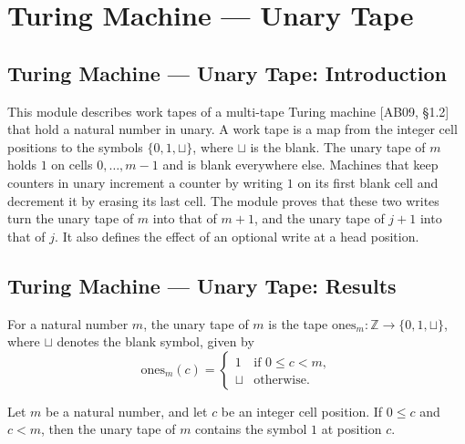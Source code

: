 \section{Turing Machine --- Unary Tape}
\subsection*{Turing Machine --- Unary Tape: Introduction}

This module describes work tapes of a multi-tape Turing machine [AB09, \S 1.2] that hold a
natural number in unary. A work tape is a map from the integer cell positions to the symbols
$\{0, 1, \sqcup\}$, where $\sqcup$ is the blank. The unary tape of $m$ holds $1$ on cells
$0, \dots, m-1$ and is blank everywhere else. Machines that keep counters in unary increment a
counter by writing $1$ on its first blank cell and decrement it by erasing its last cell. The
module proves that these two writes turn the unary tape of $m$ into that of $m+1$, and the unary
tape of $j+1$ into that of $j$. It also defines the effect of an optional write at a head
position.

\subsection*{Turing Machine --- Unary Tape: Results}

\begin{definition}
\label{Turing.UnaryTape.ones}
\leanok
For a natural number $m$, the unary tape of $m$ is the tape
$\mathrm{ones}_m : \mathbb{Z} \to \{0, 1, \sqcup\}$, where $\sqcup$ denotes the blank symbol,
given by
\[
  \mathrm{ones}_m(c) =
  \begin{cases}
    1 & \text{if } 0 \le c < m, \\
    \sqcup & \text{otherwise.}
  \end{cases}
\]
\end{definition}

\begin{theorem}
\label{Turing.UnaryTape.ones_lt}
\leanok
{}
Let $m$ be a natural number, and let $c$ be an integer cell position. If $0 \le c$ and
$c < m$, then the unary tape of $m$ contains the symbol $1$ at position $c$.
\end{theorem}

